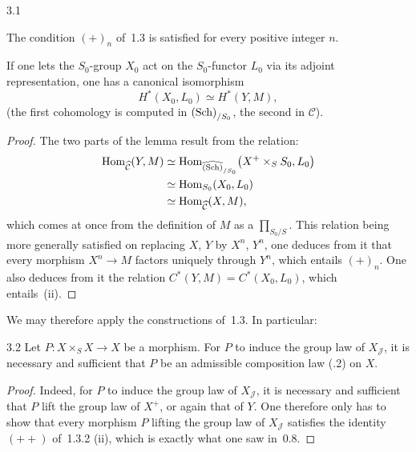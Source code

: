 \begin{lemma}{3.1}\label{III.3.1}
\begin{enumeratei}
\item The condition \((+)_{n}\) of~1.3 is satisfied for every positive integer
\(n\).
\item If one lets the \(S_{0}\)-group \(X_{0}\) act on the \(S_{0}\)-functor
\(L_{0}\) via its adjoint representation, one has a canonical isomorphism
\[
H^{*}(X_{0},L_{0})\simeq H^{*}(Y,M),
\]
(the first cohomology is computed in \(\textup{(Sch)}_{/S_{0}}\), the second in
\(\mathcal{C}\)).
\end{enumeratei}
\end{lemma}

\begin{proof}
\renewcommand{\qedsymbol}{}
The two parts of the lemma result from the relation:
\begin{align*}
\operatorname{Hom}_{\widehat{\mathcal{C}}}(Y,M)
  &\simeq\operatorname{Hom}_{\widehat{\textup{(Sch)}}_{/S_{0}}}\bigl(X^{+}\times_{S}S_{0},L_{0}\bigr) \\
  &\simeq\operatorname{Hom}_{S_{0}}(X_{0},L_{0}) \\
  &\simeq\operatorname{Hom}_{\widehat{\mathcal{C}}}(X,M),
\end{align*}
which comes at once from the definition of \(M\) as a
\(\prod_{S_{0}/S}\). This relation being more generally satisfied on replacing
\(X\), \(Y\) by \(X^{n}\), \(Y^{n}\), one deduces from it that every morphism
\(X^{n}\to M\) factors uniquely through \(Y^{n}\), which entails \((+)_{n}\).
One also deduces from it the relation \(C^{*}(Y,M)=C^{*}(X_{0},L_{0})\), which
entails~(ii).
\end{proof}

We may therefore apply the constructions of~1.3. In particular:

\begin{lemma}{3.2}\label{III.3.2}
Let \(P\colon X\times_{S}X\to X\) be a morphism. For \(P\) to induce the group
law of \(X_{\mathcal{J}}\), it is necessary and sufficient that \(P\) be an
admissible composition law (.2) on \(X\).
\end{lemma}

\begin{proof}
\renewcommand{\qedsymbol}{}
Indeed, for \(P\) to induce the group law of \(X_{\mathcal{J}}\), it is
necessary and sufficient that \(P\) lift the group law of \(X^{+}\), or again
that of \(Y\). One therefore only has to show that every morphism \(P\) lifting
the group law of \(X_{\mathcal{J}}\) satisfies the identity \((++)\) of~1.3.2
(ii), which is exactly what one saw in~0.8.
\end{proof}

